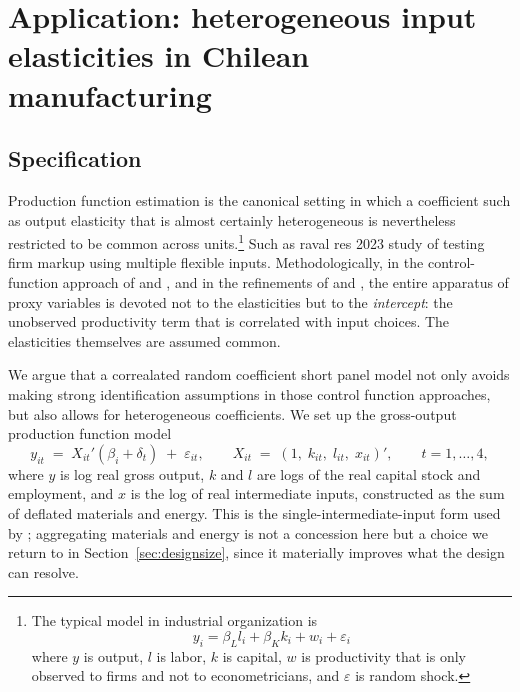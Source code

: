\documentclass{article}
\begin{document}
\section{Application: heterogeneous input elasticities in Chilean
manufacturing}
\label{sec:chile}

\subsection{Specification}

Production function estimation is the canonical setting in which a coefficient such as output elasticity
that is almost certainly heterogeneous is nevertheless restricted to be common
across units.\footnote{The typical model in industrial organization is \begin{equation}
    y_{i} = \beta_L l_i + \beta_K k_i +  w_i + \varepsilon_i  
\end{equation}
where $y$ is output, $l$ is labor, $k$ is capital, $w$ is productivity that is only observed to firms and not to econometricians, and $\varepsilon$ is random shock.}  Such as raval res 2023 study of testing firm markup using multiple flexible inputs. Methodologically, in the control-function approach of \citet{OlleyPakes1996} and
\citet{LevinsohnPetrin2003}, and in the refinements of \citet{ACF2015} and
\citet{GNR2020}, the entire apparatus of proxy variables is devoted not to the
elasticities but to the \emph{intercept}: the unobserved productivity term that is correlated with input choices. The elasticities themselves are assumed common.

We argue that a correalated random coefficient short panel model not only avoids making strong identification assumptions in those control function approaches, but also allows for heterogeneous coefficients. We set up the gross-output production function model
\begin{equation}
  y_{it} \;=\; X_{it}'(\beta_i + \delta_t) \;+\; \varepsilon_{it},
  \qquad
  X_{it} \;=\; (1,\; k_{it},\; l_{it},\; x_{it})',
  \qquad t = 1,\dots,4,
  \label{eq:klm}
\end{equation}
where $y$ is log real gross output, $k$ and $l$ are logs of the real capital
stock and employment, and $x$ is the log of real intermediate inputs,
constructed as the sum of deflated materials and energy. This is the
single-intermediate-input form used by \citet{GNR2020}; aggregating materials
and energy is not a concession here but a choice we return to in
Section~\ref{sec:designsize}, since it materially improves what the design can
resolve.
\end{document}
